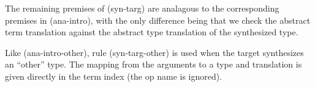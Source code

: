 \documentclass[10pt,preprint]{sigplanconf}
\newtheorem{lemma}{Lemma}
\newtheorem{definition}{Definition}
\begin{document}
The remaining premises of (syn-targ) are analagous to the corresponding premises in (ana-intro), with the only difference being that we check the abstract term translation against the abstract type translation of the synthesized type. 

Like (ana-intro-other), rule (syn-targ-other) is used when the target synthesizes an ``other'' type. The mapping from the arguments to a type and translation is given directly in the term index (the op name is ignored).






\end{document}
